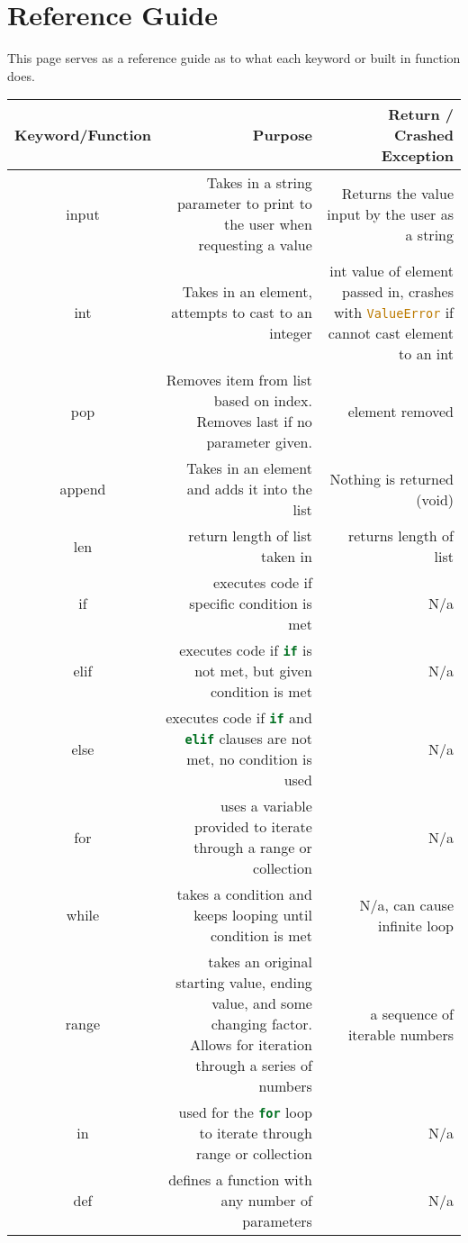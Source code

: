 \documentclass[12pt]{report}
\begin{document}
\section*{Reference Guide}
This page serves as a reference guide as to what each keyword or built in function does.\\
\begin{tabular}{| c | R | R |}
    \hline
    Keyword/Function & Purpose & Return / Crashed Exception \\
    \hline
    input & Takes in a string parameter to print to the user when requesting a value & Returns the value input by the user as a string \\
    \hline
    int & Takes in an element, attempts to cast to an integer & int value of element passed in, crashes with \lstinline[language=Python]!ValueError! if cannot cast element to an int \\
    \hline
    pop & Removes item from list based on index. Removes last if no parameter given. & element removed \\
    \hline
    append & Takes in an element and adds it into the list & Nothing is returned (void) \\
    \hline
    len & return length of list taken in & returns length of list \\
    \hline
    if & executes code if specific condition is met & N/a \\
    \hline
    elif & executes code if \lstinline[language=Python]!if! is not met, but given condition is met & N/a \\
    \hline
    else & executes code if \lstinline[language=Python]!if! and \lstinline[language=Python]!elif! clauses are not met, no condition is used & N/a \\
    \hline
    for & uses a variable provided to iterate through a range or collection & N/a \\
    \hline
    while & takes a condition and keeps looping until condition is met & N/a, can cause infinite loop \\
    \hline
    range & takes an original starting value, ending value, and some changing factor. Allows for iteration through a series of numbers & a sequence of iterable numbers \\
    \hline
    in & used for the \lstinline[language=Python]!for! loop to iterate through range or collection & N/a \\
    \hline
    def & defines a function with any number of parameters & N/a \\

\end{tabular}
\end{document}
